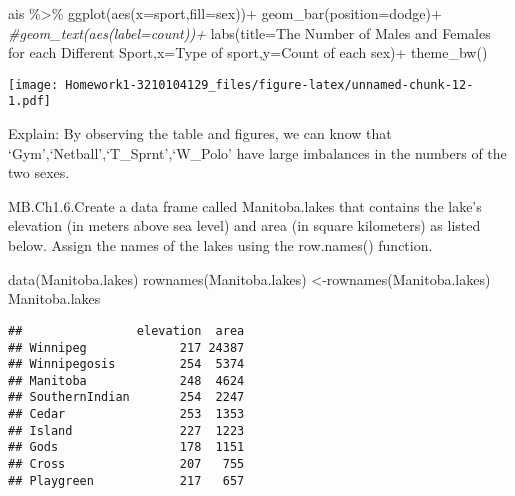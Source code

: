 \documentclass[
]{article}
\newenvironment{Shaded}{\begin{snugshade}}{\end{snugshade}}
\newcommand{\AttributeTok}[1]{\textcolor[rgb]{0.77,0.63,0.00}{#1}}
\newcommand{\CommentTok}[1]{\textcolor[rgb]{0.56,0.35,0.01}{\textit{#1}}}
\newcommand{\FunctionTok}[1]{\textcolor[rgb]{0.00,0.00,0.00}{#1}}
\newcommand{\NormalTok}[1]{#1}
\newcommand{\OtherTok}[1]{\textcolor[rgb]{0.56,0.35,0.01}{#1}}
\newcommand{\SpecialCharTok}[1]{\textcolor[rgb]{0.00,0.00,0.00}{#1}}
\newcommand{\StringTok}[1]{\textcolor[rgb]{0.31,0.60,0.02}{#1}}
\begin{document}
\begin{Shaded}
\begin{Highlighting}[]
\NormalTok{ais }\SpecialCharTok{\%\textgreater{}\%} \FunctionTok{ggplot}\NormalTok{(}\FunctionTok{aes}\NormalTok{(}\AttributeTok{x=}\NormalTok{sport,}\AttributeTok{fill=}\NormalTok{sex))}\SpecialCharTok{+}
  \FunctionTok{geom\_bar}\NormalTok{(}\AttributeTok{position=}\StringTok{\textquotesingle{}dodge\textquotesingle{}}\NormalTok{)}\SpecialCharTok{+}
  \CommentTok{\#geom\_text(aes(label=count))+}
  \FunctionTok{labs}\NormalTok{(}\AttributeTok{title=}\StringTok{\textquotesingle{}The Number of Males and Females for each Different Sport\textquotesingle{}}\NormalTok{,}\AttributeTok{x=}\StringTok{\textquotesingle{}Type of sport\textquotesingle{}}\NormalTok{,}\AttributeTok{y=}\StringTok{\textquotesingle{}Count of each sex\textquotesingle{}}\NormalTok{)}\SpecialCharTok{+}
  \FunctionTok{theme\_bw}\NormalTok{()}
\end{Highlighting}
\end{Shaded}

\texttt{[image: Homework1-3210104129\_files/figure-latex/unnamed-chunk-12-1.pdf]}

Explain: By observing the table and figures, we can know that
`Gym',`Netball',`T\_Sprnt',`W\_Polo' have large imbalances in the
numbers of the two sexes.

MB.Ch1.6.Create a data frame called Manitoba.lakes that contains the
lake's elevation (in meters above sea level) and area (in square
kilometers) as listed below. Assign the names of the lakes using the
row.names() function.

\begin{Shaded}
\begin{Highlighting}[]
\FunctionTok{data}\NormalTok{(Manitoba.lakes)}
\FunctionTok{rownames}\NormalTok{(Manitoba.lakes) }\OtherTok{\textless{}{-}}\FunctionTok{rownames}\NormalTok{(Manitoba.lakes)}
\NormalTok{Manitoba.lakes}
\end{Highlighting}
\end{Shaded}

\begin{verbatim}
##                elevation  area
## Winnipeg             217 24387
## Winnipegosis         254  5374
## Manitoba             248  4624
## SouthernIndian       254  2247
## Cedar                253  1353
## Island               227  1223
## Gods                 178  1151
## Cross                207   755
## Playgreen            217   657
\end{verbatim}
\end{document}
